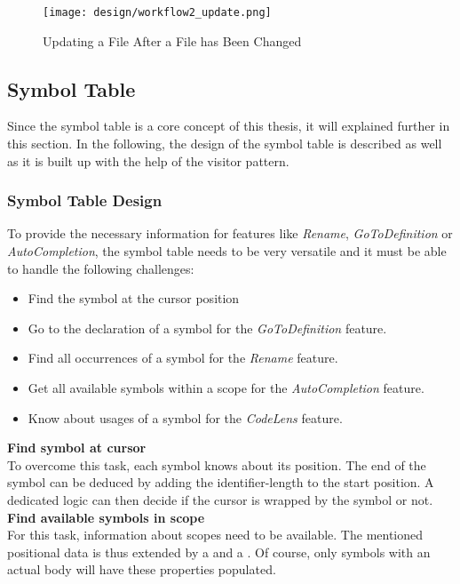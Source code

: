\begin{figure}[H]
    \centering
    \texttt{[image: design/workflow2\_update.png]}
    \caption{Updating a File After a File has Been Changed}
    \label{fig:workflow2}
\end{figure}


\subsection{Symbol Table}
Since the symbol table is a core concept of this thesis, it will explained further in this section.
In the following, the design of the symbol table is described as well as it is built up with the help of the visitor pattern.

\subsubsection{Symbol Table Design}
To provide the necessary information for features like \textit{Rename}, \textit{GoToDefinition} or \textit{AutoCompletion},
the symbol table needs to be very versatile and it must be able to handle the following challenges:
\begin{itemize}
    \item Find the symbol at the cursor position
    \item Go to the declaration of a symbol for the \textit{GoToDefinition} feature.
    \item Find all occurrences of a symbol for the \textit{Rename} feature.
    \item Get all available symbols within a scope for the \textit{AutoCompletion} feature.
    \item Know about usages of a symbol for the \textit{CodeLens} feature.
\end{itemize}

\textbf{Find symbol at cursor}\\
To overcome this task, each symbol knows about its position.
The end of the symbol can be deduced by adding the identifier-length to the start position.
A dedicated logic can then decide if the cursor is wrapped by the symbol or not.\\

\textbf{Find available symbols in scope}\\
For this task, information about scopes need to be available.
The mentioned positional data is thus extended by a  and a .
Of course, only symbols with an actual body will have these properties populated.\\

